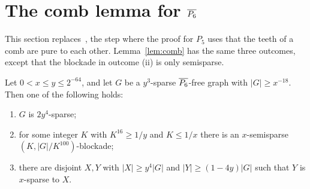 \section{The comb lemma for \texorpdfstring{$\overline{P_6}$}{co-P6}}\label{sec:comb}

This section replaces~\cite[Lemma 5.2]{NSS7}, the step where the proof for $P_5$ uses that the teeth of a
comb are pure to each other. Lemma~\ref{lem:comb} has the same three outcomes, except that the blockade
in outcome (ii) is only semisparse.

\begin{lemma}\label{lem:comb}
Let $0<x\le y\le2^{-64}$, and let $G$ be a $y^3$-sparse $\overline{P_6}$-free graph with $|G|\ge x^{-18}$. Then one
of the following holds:
\begin{enumerate}[label=(\roman*)]
\item $G$ is $2y^4$-sparse;
\item for some integer $K$ with $K^{16}\ge1/y$ and $K\le1/x$ there is an $x$-semisparse
  $(K,|G|/K^{100})$-blockade;
\item there are disjoint $X,Y$ with $|X|\ge y^4|G|$ and $|Y|\ge(1-4y)|G|$ such that $Y$ is $x$-sparse to $X$.
\end{enumerate}
\end{lemma}

